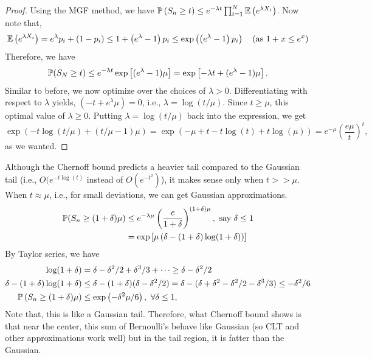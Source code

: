 \documentclass[12pt]{article}
\begin{document}
\begin{proof}
    Using the MGF method, we have $\mathbb{P}\left(S_n \geq t\right) \leq e^{-\lambda t} \prod_{i=1}^{N} \mathbb{E}\left(e^{\lambda X_i}\right)$. Now note that,
    \begin{equation*}
        \mathbb{E}\left(e^{\lambda X_i}\right) = e^{\lambda}p_i + (1 - p_i) \leq 1 + \left(e^{\lambda} - 1\right)p_i \leq \exp\left(\left(e^{\lambda} - 1\right) p_i\right) \quad (\text{as } 1 + x \leq e^x)
    \end{equation*}
    \noindent Therefore, we have
    \begin{equation*}
        \mathbb{P}(S_N \geq t) \leq e^{-\lambda t} \exp\left[ (e^\lambda - 1)\mu \right] = \exp\left[ -\lambda t + (e^\lambda - 1)\mu \right].
    \end{equation*}
    \noindent Similar to before, we now optimize over the choices of $\lambda > 0$. Differentiating with respect to $\lambda$ yields, $(-t + e^\lambda \mu) = 0$, i.e., $\lambda = \log(t/\mu)$. Since $t \geq \mu$, this optimal value of $\lambda \geq 0$. Putting $\lambda = \log(t/\mu)$ back into the expression, we get
    \begin{equation*}
        \exp\left( -t\log(t/\mu) + (t/\mu - 1)\mu \right) = \exp\left( -\mu + t - t\log(t) + t\log(\mu) \right) = e^{-\mu}\left( \dfrac{e\mu}{t} \right)^t,
    \end{equation*}
    \noindent as we wanted.
\end{proof}

Although the Chernoff bound predicts a heavier tail compared to the Gaussian tail (i.e., $O(e^{-t \log(t)}$ instead of $O(e^{-t^2})$), it makes sense only when $t >> \mu$. When $t \approx \mu$, i.e., for small deviations, we can get Gaussian approximations.
\begin{align*}
    \mathbb{P}(S_n \geq (1+\delta)\mu)
     & \leq e^{-\lambda \mu} \left(\frac{e}{1+\delta}\right)^{(1+\delta)\mu}, \text{ say } \delta \leq 1 \\
     & = \exp\left[ \mu\left( \delta - (1+\delta)\log(1+\delta) \right) \right]
\end{align*}
\noindent By Taylor series, we have
\begin{align*}
    \log(1+\delta)                             & = \delta - \delta^2/2 + \delta^3/3 + \dots \geq \delta - \delta^2/2                                                     \\
    \delta - (1+\delta)\log(1+\delta)          & \leq \delta - (1+\delta)(\delta - \delta^2/2) = \delta - (\delta + \delta^2 - \delta^2/2 - \delta^3/3) \leq -\delta^2/6 \\
    \mathbb{P}\left( S_n \geq (1+\delta)\mu \right) & \leq \exp\left( -\delta^2\mu/6 \right), \ \forall \delta \leq 1,
\end{align*}
\noindent Note that, this is like a Gaussian tail. Therefore, what Chernoff bound shows is that near the center, this sum of Bernoulli's behave like Gaussian (so CLT and other approximations work well) but in the tail region, it is fatter than the Gaussian.
\end{document}
